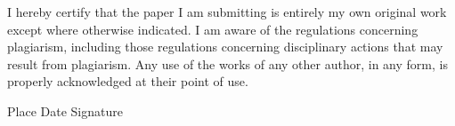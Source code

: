 I hereby certify that the paper I am submitting is entirely my own original work except
where otherwise indicated. I am aware of the regulations concerning
plagiarism, including those regulations concerning disciplinary actions that may result
from plagiarism. Any use of the works of any other author, in any form, is properly
acknowledged at their point of use.

\bigskip
\bigskip

Place \hfil Date \hfil Signature